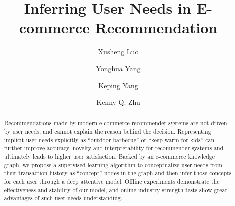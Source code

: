 \documentclass[sigconf]{acmart}
\newcommand{\KZ}[1]{\textcolor{red}{Kenny: #1}}
\newcommand{\XS}[1]{\textcolor{blue}{Xusheng: #1}}
\begin{document}
\title{Inferring User Needs in E-commerce Recommendation}

\author{Xusheng Luo}

\author{Yonghua Yang}

\author{Keping Yang}

\author{Kenny Q. Zhu }

\begin{abstract}
Recommendations made by modern e-commerce recommender systems are not driven
by user needs, and cannot explain the reason behind the decision.
Representing implicit user needs explicitly as ``outdoor barbecue'' 
or ``keep warm for kids'' can further improve accuracy, novelty and interpretability
for recommender systems and ultimately leads to higher user satisfaction.
Backed by an e-commerce knowledge graph, 
we propose a supervised learning algorithm to conceptualize user needs from 
their transaction history as ``concept'' nodes in the graph 
and then infer those concepts for each user
through a deep attentive model.
Offline experiments demonstrate the effectiveness and stability of our model,
and online industry strength tests show great advantages of such 
user needs understanding.
\end{abstract}

%
%






\maketitle










\end{document}
